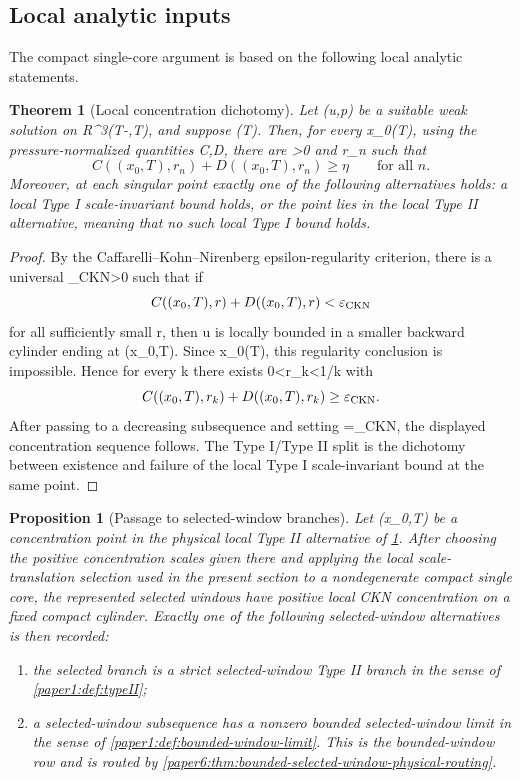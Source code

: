 \documentclass[11pt]{amsart}
\def\({}%
\def\){}%
\def\mathbb#1{#1}%
\theoremstyle{plain}
\newtheorem{theorem}{Theorem}[section]
\newtheorem{proposition}[proposition]{Proposition}
\theoremstyle{definition}
\theoremstyle{remark}
\begin{document}
\subsection{Local analytic inputs}

The compact single-core argument is based on the following local analytic statements.

\begin{theorem}[Local concentration dichotomy]
\label{paper1:thm:paper0-dichotomy}
Let \((u,p)\) be a suitable weak solution on
\(\mathbb R^3\times(T-\delta,T)\), and suppose \(\Sigma(T)\ne\emptyset\).
Then, for every \(x_0\in\Sigma(T)\), using the pressure-normalized quantities
\(C,D\), there are \(\eta>0\) and \(r_n\) such that
\[
  C((x_0,T),r_n)+D((x_0,T),r_n)\ge\eta
  \qquad\text{for all }n.
\]
Moreover, at each singular point exactly one of the following alternatives
holds: a local Type I scale-invariant bound holds, or the point lies in the
local Type II alternative, meaning that no such local Type I bound holds.
\end{theorem}

\begin{proof}
By the Caffarelli--Kohn--Nirenberg epsilon-regularity criterion, there is a
universal \(\varepsilon_{\rm CKN}>0\) such that if
\[
  C((x_0,T),r)+D((x_0,T),r)<\varepsilon_{\rm CKN}
\]
for all sufficiently small \(r\), then \(u\) is locally bounded in a smaller
backward cylinder ending at \((x_0,T)\).  Since \(x_0\in\Sigma(T)\), this
regularity conclusion is impossible.  Hence for every \(k\) there exists
\(0<r_k<1/k\) with
\[
  C((x_0,T),r_k)+D((x_0,T),r_k)\ge\varepsilon_{\rm CKN}.
\]
After passing to a decreasing subsequence and setting
\(\eta=\varepsilon_{\rm CKN}\), the displayed concentration sequence follows.
The Type I/Type II split is the dichotomy between existence and failure of the
local Type I scale-invariant bound at the same point.
\end{proof}

\begin{proposition}[Passage to selected-window branches]
\label{paper1:prop:paper0-typeII-reduction}
Let \((x_0,T)\) be a concentration point in the physical local Type II
alternative of \cref{paper1:thm:paper0-dichotomy}.  After choosing the positive
concentration scales given there and applying the local scale-translation
selection used in the present section to a nondegenerate compact single core,
the represented selected windows have positive local CKN concentration on a
fixed compact cylinder.  Exactly one of the following selected-window
alternatives is then recorded:
\begin{enumerate}[label=\textup{(\roman*)}]
\item the selected branch is a strict selected-window Type II branch in the
sense of \cref{paper1:def:typeII};
\item a selected-window subsequence has a nonzero bounded selected-window limit
in the sense of \cref{paper1:def:bounded-window-limit}.  This is the
bounded-window row and is routed by
\cref{paper6:thm:bounded-selected-window-physical-routing}.
\end{enumerate}
\end{proposition}
\end{document}
